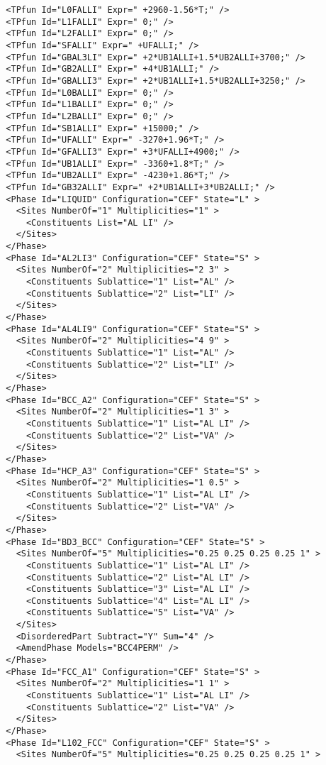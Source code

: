 \documentclass{article}
\begin{document}
\begin{appendices}
\begin{verbatim}
  <TPfun Id="L0FALLI" Expr=" +2960-1.56*T;" /> 
  <TPfun Id="L1FALLI" Expr=" 0;" /> 
  <TPfun Id="L2FALLI" Expr=" 0;" /> 
  <TPfun Id="SFALLI" Expr=" +UFALLI;" /> 
  <TPfun Id="GBAL3LI" Expr=" +2*UB1ALLI+1.5*UB2ALLI+3700;" /> 
  <TPfun Id="GB2ALLI" Expr=" +4*UB1ALLI;" /> 
  <TPfun Id="GBALLI3" Expr=" +2*UB1ALLI+1.5*UB2ALLI+3250;" /> 
  <TPfun Id="L0BALLI" Expr=" 0;" /> 
  <TPfun Id="L1BALLI" Expr=" 0;" /> 
  <TPfun Id="L2BALLI" Expr=" 0;" /> 
  <TPfun Id="SB1ALLI" Expr=" +15000;" /> 
  <TPfun Id="UFALLI" Expr=" -3270+1.96*T;" /> 
  <TPfun Id="GFALLI3" Expr=" +3*UFALLI+4900;" /> 
  <TPfun Id="UB1ALLI" Expr=" -3360+1.8*T;" /> 
  <TPfun Id="UB2ALLI" Expr=" -4230+1.86*T;" /> 
  <TPfun Id="GB32ALLI" Expr=" +2*UB1ALLI+3*UB2ALLI;" /> 
  <Phase Id="LIQUID" Configuration="CEF" State="L" >
    <Sites NumberOf="1" Multiplicities="1" >
      <Constituents List="AL LI" />
    </Sites>
  </Phase>
  <Phase Id="AL2LI3" Configuration="CEF" State="S" >
    <Sites NumberOf="2" Multiplicities="2 3" >
      <Constituents Sublattice="1" List="AL" />
      <Constituents Sublattice="2" List="LI" />
    </Sites>
  </Phase>
  <Phase Id="AL4LI9" Configuration="CEF" State="S" >
    <Sites NumberOf="2" Multiplicities="4 9" >
      <Constituents Sublattice="1" List="AL" />
      <Constituents Sublattice="2" List="LI" />
    </Sites>
  </Phase>
  <Phase Id="BCC_A2" Configuration="CEF" State="S" >
    <Sites NumberOf="2" Multiplicities="1 3" >
      <Constituents Sublattice="1" List="AL LI" />
      <Constituents Sublattice="2" List="VA" />
    </Sites>
  </Phase>
  <Phase Id="HCP_A3" Configuration="CEF" State="S" >
    <Sites NumberOf="2" Multiplicities="1 0.5" >
      <Constituents Sublattice="1" List="AL LI" />
      <Constituents Sublattice="2" List="VA" />
    </Sites>
  </Phase>
  <Phase Id="BD3_BCC" Configuration="CEF" State="S" >
    <Sites NumberOf="5" Multiplicities="0.25 0.25 0.25 0.25 1" >
      <Constituents Sublattice="1" List="AL LI" />
      <Constituents Sublattice="2" List="AL LI" />
      <Constituents Sublattice="3" List="AL LI" />
      <Constituents Sublattice="4" List="AL LI" />
      <Constituents Sublattice="5" List="VA" />
    </Sites>
    <DisorderedPart Subtract="Y" Sum="4" />
    <AmendPhase Models="BCC4PERM" />
  </Phase>
  <Phase Id="FCC_A1" Configuration="CEF" State="S" >
    <Sites NumberOf="2" Multiplicities="1 1" >
      <Constituents Sublattice="1" List="AL LI" />
      <Constituents Sublattice="2" List="VA" />
    </Sites>
  </Phase>
  <Phase Id="L102_FCC" Configuration="CEF" State="S" >
    <Sites NumberOf="5" Multiplicities="0.25 0.25 0.25 0.25 1" >

\end{verbatim}
\end{appendices}
\end{document}
